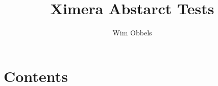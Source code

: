 \documentclass{xourse}
\begin{document}
    \author{Wim Obbels}
    \title{Ximera Abstarct Tests}

\part{Contents}
\end{document}
